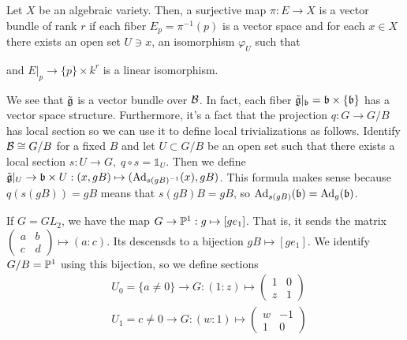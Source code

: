 \begin{remark}
    Let $X$ be an algebraic variety. Then, a surjective map $\pi: E\to X$ is a vector bundle of rank $r$ if 
    each fiber $E_p =\pi^{-1}(p)$ is a vector space and for each $x\in X$ there exists an open 
    set $U\ni x$, an isomorphism $\varphi_U$ such that 
    \begin{center}
    \end{center}
    and $E|_p\to \{p\}\times k^r$ is a linear isomorphism.
\end{remark}
We see that $\tilde{\mathfrak{g}}$ is a vector bundle over $\mathcal{B}$. In fact, each fiber $\tilde{\mathfrak{g}}|_{\mathfrak{b}}=\mathfrak{b}\times\{\mathfrak{b}\}$ 
has a vector space structure. Furthermore, it's a fact that the projection $q:G\to G/B$ has local section so we can use it 
to define local trivializations as follows. Identify $\mathcal{B}\cong G/B$ for a fixed $B$ and let $U\subset G/B$ be an open set 
such that there exists a local section $s:U\to G,\;q\circ s = \mathds{1}_U$. Then we define 
$\tilde{\mathfrak{g}}|_U\to \mathfrak{b}\times U:(x,gB)\mapsto (\text{Ad}_{s(gB)^{-1}}(x),gB)$. This formula makes sense because 
$q(s(gB))=gB$ means that $s(gB)B=gB$, so $\text{Ad}_{s(gB)}(\mathfrak{b})=\text{Ad}_g(\mathfrak{b})$. 
\begin{example}
    If $G=GL_2$, we have the map $G\to \mathbb{P}^1:g\mapsto [ge_1]$. That is, it sends the matrix 
    $\left(\begin{smallmatrix}a&b\\c&d\end{smallmatrix}\right)\mapsto (a:c)$. Its descensds to 
    a bijection $gB\mapsto [ge_1]$. We identify $G/B=\mathbb{P}^1$ using this bijection, so we define sections  
    \begin{equation}
        \begin{split}
            &U_0=\{a\neq0\}\to G:(1:z)\mapsto \left(\begin{smallmatrix}1&0\\z&1\end{smallmatrix}\right)\\
            &U_1={c\neq0}\to G: (w:1)\mapsto \left(\begin{smallmatrix}w&-1\\1&0\end{smallmatrix}\right)
        \end{split}
    \end{equation}
\end{example}

